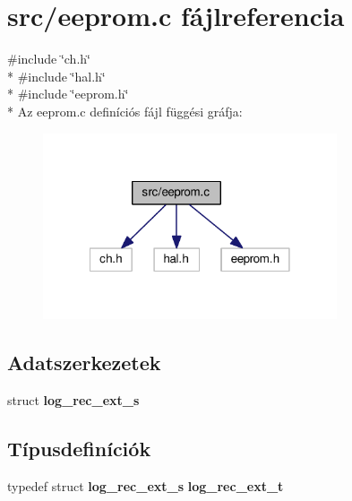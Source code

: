 \section{src/eeprom.c fájlreferencia}
\label{eeprom_8c}
{\ttfamily \#include \char`\"{}ch.\-h\char`\"{}}\\*
{\ttfamily \#include \char`\"{}hal.\-h\char`\"{}}\\*
{\ttfamily \#include \char`\"{}eeprom.\-h\char`\"{}}\\*
Az eeprom.\-c definíciós fájl függési gráfja\-:
\nopagebreak
\begin{figure}[H]
\begin{center}
\leavevmode
\includegraphics[width=246pt]{eeprom_8c__incl}
\end{center}
\end{figure}
\subsection*{Adatszerkezetek}
\begin{DoxyCompactItemize}
\item 
struct {\bf log\-\_\-rec\-\_\-ext\-\_\-s}
\end{DoxyCompactItemize}
\subsection*{Típusdefiníciók}
\begin{DoxyCompactItemize}
\item 
typedef struct {\bf log\-\_\-rec\-\_\-ext\-\_\-s} {\bf log\-\_\-rec\-\_\-ext\-\_\-t}
\end{DoxyCompactItemize}
